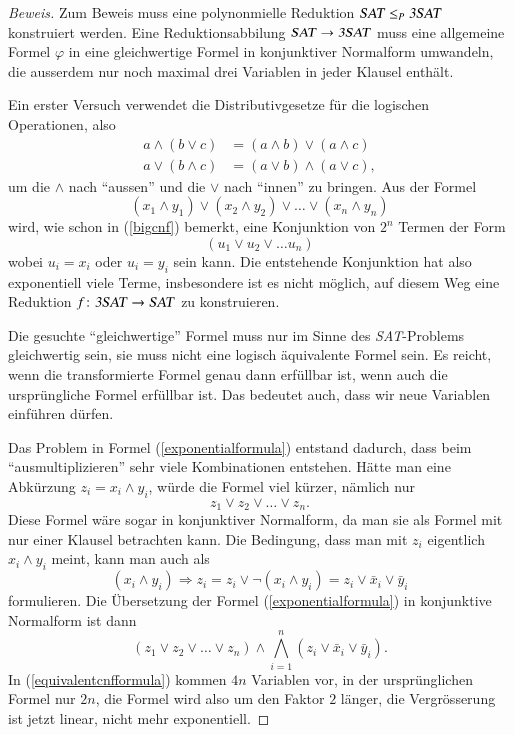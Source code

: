 \begin{proof}[Beweis]
Zum Beweis muss eine polynonmielle Reduktion
$\text{\textsl{SAT}}\le_P\text{\textsl{3SAT}}$ konstruiert werden.
Eine Reduktionsabbilung
$\text{\textsl{SAT}}\to\text{\textsl{3SAT}}$ muss eine allgemeine Formel
$\varphi$ in eine gleichwertige Formel in konjunktiver Normalform umwandeln, 
die ausserdem nur noch maximal drei Variablen in jeder Klausel enthält.

Ein erster Versuch verwendet die Distributivgesetze für die 
logischen Operationen, also
\begin{align*}
a\wedge(b\vee c)&=(a\wedge b)\vee(a\wedge c)\\
a\vee(b\wedge c)&=(a\vee b)\wedge(a\vee c),
\end{align*}
um die $\wedge$ nach ``aussen'' und die $\vee$ nach ``innen'' zu
bringen.
Aus der Formel 
\begin{equation}
(x_1\wedge y_1)
\vee
(x_2\wedge y_2)
\vee
\dots
\vee
(x_n\wedge y_n)
\label{exponentialformula}
\end{equation}
wird, wie schon in (\ref{bigcnf}) bemerkt, eine Konjunktion von $2^n$
Termen der Form
\[
(u_1\vee u_2\vee \dots u_n)
\]
wobei $u_i=x_i$ oder $u_i=y_i$ sein kann.
Die entstehende Konjunktion hat also exponentiell viele Terme, insbesondere
ist es nicht möglich, auf diesem Weg eine Reduktion
$f\colon\text{\textsl{3SAT}}\to\text{\textsl{SAT}}$ zu konstruieren.

Die gesuchte ``gleichwertige'' Formel muss nur im Sinne des
\textsl{SAT}-Problems gleichwertig sein, sie muss nicht eine
logisch äquivalente Formel sein.
Es reicht, wenn die transformierte
Formel genau dann erfüllbar ist, wenn auch die ursprüngliche Formel
erfüllbar ist.
Das bedeutet auch, dass wir neue Variablen einführen
dürfen.

Das Problem in Formel (\ref{exponentialformula}) entstand dadurch, dass
beim ``ausmultiplizieren'' sehr viele Kombinationen entstehen.
Hätte man eine Abkürzung $z_i=x_i\wedge y_i$, würde die Formel viel
kürzer, nämlich nur
\[
z_1\vee z_2\vee\dots\vee z_n.
\]
Diese Formel wäre sogar in konjunktiver Normalform, da man sie
als Formel mit nur einer Klausel betrachten kann.
Die Bedingung, dass man mit $z_i$ eigentlich $x_i\wedge y_i$ 
meint, kann man auch als 
\[
(x_i\wedge y_i)\Rightarrow z_i
=
z_i\vee \neg(x_i\wedge y_i)
=
z_i\vee \bar x_i\vee\bar y_i
\]
formulieren.
Die Übersetzung der Formel (\ref{exponentialformula})
in konjunktive Normalform ist dann
\begin{equation}
(z_1\vee z_2\vee\dots\vee z_n)
\wedge
\bigwedge_{i=1}^n (z_i\vee \bar x_i\vee\bar y_i).
\label{equivalentcnfformula}
\end{equation}
In (\ref{equivalentcnfformula}) kommen $4n$ Variablen vor,
in der ursprünglichen Formel
nur $2n$, die Formel wird also um den Faktor $2$ länger, die
Vergrösserung ist jetzt linear, nicht mehr exponentiell.


\end{proof}
